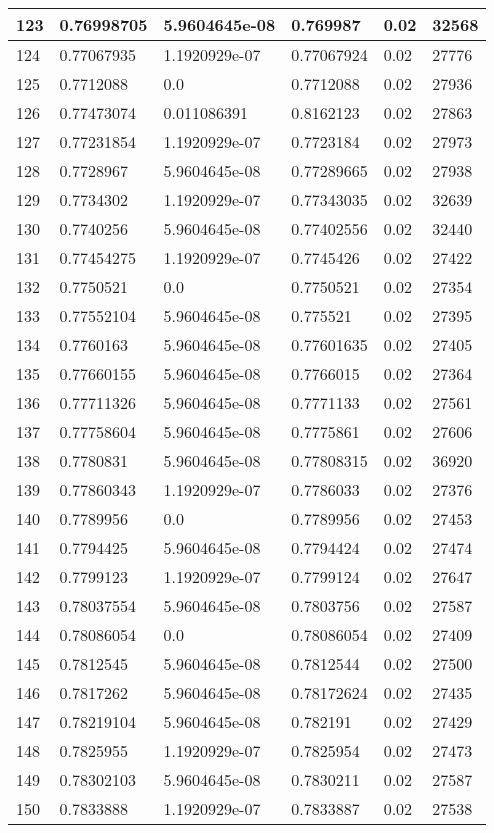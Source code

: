 \begin{longtable}{|l|l|l|l|l|l|}
123 & 0.76998705 & 5.9604645e-08 & 0.769987 & 0.02 & 32568 \\ \hline 
124 & 0.77067935 & 1.1920929e-07 & 0.77067924 & 0.02 & 27776 \\ \hline 
125 & 0.7712088 & 0.0 & 0.7712088 & 0.02 & 27936 \\ \hline 
126 & 0.77473074 & 0.011086391 & 0.8162123 & 0.02 & 27863 \\ \hline 
127 & 0.77231854 & 1.1920929e-07 & 0.7723184 & 0.02 & 27973 \\ \hline 
128 & 0.7728967 & 5.9604645e-08 & 0.77289665 & 0.02 & 27938 \\ \hline 
129 & 0.7734302 & 1.1920929e-07 & 0.77343035 & 0.02 & 32639 \\ \hline 
130 & 0.7740256 & 5.9604645e-08 & 0.77402556 & 0.02 & 32440 \\ \hline 
131 & 0.77454275 & 1.1920929e-07 & 0.7745426 & 0.02 & 27422 \\ \hline 
132 & 0.7750521 & 0.0 & 0.7750521 & 0.02 & 27354 \\ \hline 
133 & 0.77552104 & 5.9604645e-08 & 0.775521 & 0.02 & 27395 \\ \hline 
134 & 0.7760163 & 5.9604645e-08 & 0.77601635 & 0.02 & 27405 \\ \hline 
135 & 0.77660155 & 5.9604645e-08 & 0.7766015 & 0.02 & 27364 \\ \hline 
136 & 0.77711326 & 5.9604645e-08 & 0.7771133 & 0.02 & 27561 \\ \hline 
137 & 0.77758604 & 5.9604645e-08 & 0.7775861 & 0.02 & 27606 \\ \hline 
138 & 0.7780831 & 5.9604645e-08 & 0.77808315 & 0.02 & 36920 \\ \hline 
139 & 0.77860343 & 1.1920929e-07 & 0.7786033 & 0.02 & 27376 \\ \hline 
140 & 0.7789956 & 0.0 & 0.7789956 & 0.02 & 27453 \\ \hline 
141 & 0.7794425 & 5.9604645e-08 & 0.7794424 & 0.02 & 27474 \\ \hline 
142 & 0.7799123 & 1.1920929e-07 & 0.7799124 & 0.02 & 27647 \\ \hline 
143 & 0.78037554 & 5.9604645e-08 & 0.7803756 & 0.02 & 27587 \\ \hline 
144 & 0.78086054 & 0.0 & 0.78086054 & 0.02 & 27409 \\ \hline 
145 & 0.7812545 & 5.9604645e-08 & 0.7812544 & 0.02 & 27500 \\ \hline 
146 & 0.7817262 & 5.9604645e-08 & 0.78172624 & 0.02 & 27435 \\ \hline 
147 & 0.78219104 & 5.9604645e-08 & 0.782191 & 0.02 & 27429 \\ \hline 
148 & 0.7825955 & 1.1920929e-07 & 0.7825954 & 0.02 & 27473 \\ \hline 
149 & 0.78302103 & 5.9604645e-08 & 0.7830211 & 0.02 & 27587 \\ \hline 
150 & 0.7833888 & 1.1920929e-07 & 0.7833887 & 0.02 & 27538 \\ \hline 
\end{longtable}
